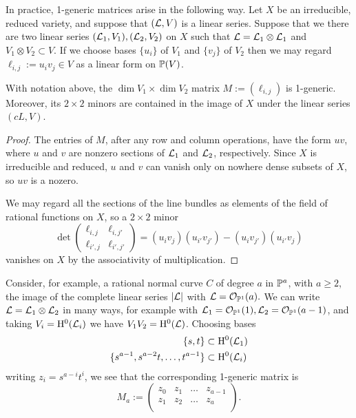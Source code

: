 In practice, 1-generic matrices arise in the following way. Let $X$ be
an irreducible, reduced variety, and suppose that $(\cL, V)$ is a linear series. Suppose that we there are two linear series $(\cL_1,V_1),  (\cL_2,V_2)$ on $X$
such that $\cL = \cL_1\otimes\cL_1$ and $V_1\otimes V_2 \subset V$. If we
choose
bases $\{u_i\}$ of $V_1$ and $\{v_j\}$ of $V_2$ then we may regard $\ell_{i,j}:=u_iv_j\in V$
as a linear form on $\PP(V)$.

\begin{proposition}\label{some generators}
 With notation above, the $\dim V_1 \times \dim V_2$ matrix 
$M :=  (\ell_{i,j})$ is 1-generic. Moreover, its $2\times 2$ minors are contained in 
the image of $X$ under the linear series $(cL, V)$.
\end{proposition}

\begin{proof}
The entries of $M$, after any row and column operations, have the form $uv$, where
$u$ and $v$ are nonzero sections of $\cL_1$ and $\cL_2$, respectively. Since $X$ is irreducible and reduced, $u$ and $v$ can vanish only on nowhere dense subsets of $X$, so $uv$ is a nozero.

We may regard all the sections of the line bundles as elements of the 
field of rational functions on $X$, so a $2\times 2$ minor 
$$
\det
\begin{pmatrix}
 \ell_{i,j}&\ell_{i,j'} \\
 \ell_{i',j}&\ell_{i',j'}
\end{pmatrix}
= (u_iv_j)(u_{i'}v_{j'}) - (u_{i}v_{j'}) (u_{i'}v_{j})
$$
vanishes on $X$ by the associativity of multiplication.
\end{proof}

Consider, for example, a rational normal curve $C$ of degree $a$ in $\PP^a$, with $a\geq 2$, 
the image of the complete linear series $|\cL|$ with $\cL = \cO_{\PP^1}(a).$ 
We can  write $\cL = \cL_1\otimes \cL_2$ in many ways, for example with
$\cL_1 = \cO_{\PP^1}(1), \cL_2 = \cO_{\PP^1}(a-1)$, and taking
$V_i = \HH^0(\cL_i)$ we have $V_1V_2 = \HH^0(\cL)$. Choosing bases
\begin{align*}
\{s,t\} &\subset   \HH^0(\cL_1)\\
\{s^{a-1}, s^{a-2}t, \dots, t^{a-1}\} &\subset \HH^0(\cL_i)\\
\end{align*}
writing $z_i = s^{a-i}t^i$, we see that the corresponding 1-generic matrix is
$$
M_a:= \begin{pmatrix}
 z_0&z_1&\dots&z_{a-1}\\
 z_1&z_2&\dots&z_{a}\\
\end{pmatrix}.
$$

